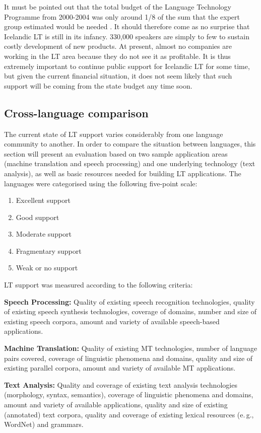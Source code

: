 \documentclass{../../metanetpaper}
\begin{document}
\begin{multicols}{2}
It must be pointed out that the total budget of the Language Technology Programme from 2000-2004 was only around 1/8 of the sum that the expert group estimated would be needed \cite{ilrt1}.  It should therefore come as no surprise that Icelandic LT is still in its infancy. 330,000 speakers are simply to few to sustain costly development of new products. At present, almost no companies are working in the LT area because they do not see it as profitable. It is thus extremely important to continue public support for Icelandic LT for some time, but given the current financial situation, it does not seem likely that such support will be coming from the state budget any time soon.

\subsection{Cross-language comparison}
The current state of LT support varies considerably from one language community to another. In order to compare the situation between languages, this section will present an evaluation based on two sample application areas (machine translation and speech processing) and one underlying technology (text analysis), as well as basic resources needed for building LT applications. The languages were categorised using the following five-point scale: 

\begin{enumerate}
\item Excellent support
\item Good support
\item Moderate support
\item Fragmentary support
\item Weak or no support
\end{enumerate}

LT support was measured according to the following criteria:

\textbf{Speech Processing:} Quality of existing speech recognition technologies, quality of existing speech synthesis technologies, coverage of domains, number and size of existing speech corpora, amount and variety of available speech-based applications.

\textbf{Machine Translation:} Quality of existing MT technologies, number of language pairs covered, coverage of linguistic phenomena and domains, quality and size of existing parallel corpora, amount and variety of available MT applications.

\textbf{Text Analysis:} Quality and coverage of existing text analysis technologies (morphology, syntax, semantics), coverage of linguistic phenomena and domains, amount and variety of available applications, quality and size of existing (annotated) text corpora, quality and coverage of existing lexical resources (e.\,g., WordNet) and grammars.


\end{multicols}
\end{document}
